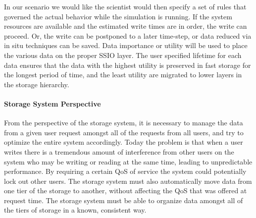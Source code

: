   In our  scenario we would like the scientist would then specify a set of rules that governed the actual behavior while the simulation is running.
If the system resources are available and the estimated write times are in order, the write can proceed.
Or, the write can be postponed to a later time-step, or data reduced via in situ techniques can be saved.
Data importance or utility will be used to place the various data on the proper SSIO layer.
The user specified lifetime for each data ensures that the data with the highest utility is preserved in fast storage
for the longest period of time, and the least utility are migrated to lower layers in the storage hierarchy.
%

\paragraph{Storage System Perspective}
\label{subsec:storage-perspective}
From the perspective of the storage system, it is necessary to manage the data from
a given user request amongst all of the requests from all users, and try to optimize the
entire system accordingly. Today the problem is that when a user writes there is a
tremendous amount of interference from other users on the system who may be
writing or reading at the same time, leading to unpredictable performance.
By requiring a certain QoS of service the system could potentially lock out other users. 
The storage system must also automatically move data from one tier of the storage to
another, without affecting the QoS that was offered at request
time. The storage system must be able to organize
data amongst all of the tiers of storage in a known, consistent way.

